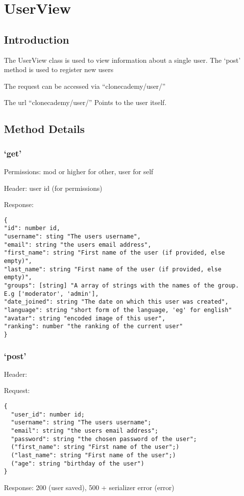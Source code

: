 \chapter*{UserView}

\section*{Introduction}\label{introduction}

The UserView class is used to view information about a single user. The
`post' method is used to register new users

The request can be accessed via ``clonecademy/user/''

The url ``clonecademy/user/'' Points to the user itself.

\section*{Method Details}\label{method-details}

\subsection*{\texorpdfstring{`get'}{get}}\label{get}

Permissions: mod or higher for other, user for self

Header: user id (for permissions)

Response:

\begin{verbatim}
{
"id": number id,
"username": sting "The users username",
"email": string "the users email address",
"first_name": string "First name of the user (if provided, else empty)",
"last_name": string "First name of the user (if provided, else empty)",
"groups": [string] "A array of strings with the names of the group. E.g ['moderator', 'admin'],
"date_joined": string "The date on which this user was created",
"language": string "short form of the language, 'eg' for english"
"avatar": string "encoded image of this user",
"ranking": number "the ranking of the current user"
}
\end{verbatim}

\subsection*{\texorpdfstring{`post'}{post}}\label{post}

Header:

Request:

\begin{verbatim}
{
  "user_id": number id;
  "username": string "The users username";
  "email": string "the users email address";
  "password": string "the chosen password of the user";
  ("first_name": string "First name of the user";)
  ("last_name": string "First name of the user";)
  ("age": string "birthday of the user")
}
\end{verbatim}

Response: 200 (user saved), 500 + serializer error (error)
